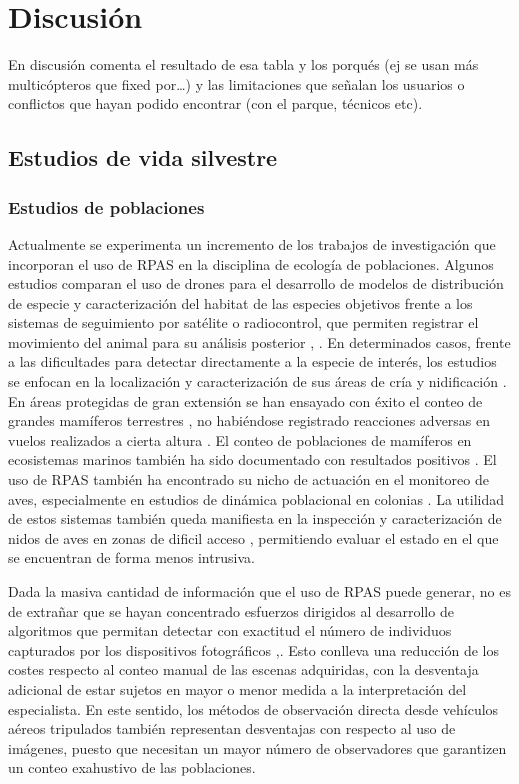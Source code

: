\documentclass[11pt,]{article}
\begin{document}
\section{Discusión}\label{discusion}

En discusión comenta el resultado de esa tabla y los porqués (ej se usan
más multicópteros que fixed por\ldots{}) y las limitaciones que señalan
los usuarios o conflictos que hayan podido encontrar (con el parque,
técnicos etc).

\subsection{Estudios de vida
silvestre}\label{estudios-de-vida-silvestre}

\subsubsection{Estudios de poblaciones}\label{estudios-de-poblaciones}

Actualmente se experimenta un incremento de los trabajos de
investigación que incorporan el uso de RPAS en la disciplina de ecología
de poblaciones. Algunos estudios comparan el uso de drones para el
desarrollo de modelos de distribución de especie y caracterización del
habitat de las especies objetivos frente a los sistemas de seguimiento
por satélite o radiocontrol, que permiten registrar el movimiento del
animal para su análisis posterior \citep{PazmanyMulero2015},
\citep{Mulero-Pazmany2015}. En determinados casos, frente a las
dificultades para detectar directamente a la especie de interés, los
estudios se enfocan en la localización y caracterización de sus áreas de
cría y nidificación \citep{VanAndel2015}. En áreas protegidas de gran
extensión se han ensayado con éxito el conteo de grandes mamíferos
terrestres , no habiéndose registrado reacciones adversas en vuelos
realizados a cierta altura \citep{Vermeulen2013}. El conteo de
poblaciones de mamíferos en ecosistemas marinos también ha sido
documentado con resultados positivos \citep{Hodgson2013}. El uso de RPAS
también ha encontrado su nicho de actuación en el monitoreo de aves,
especialmente en estudios de dinámica poblacional en colonias
\citep{Sarda-Palomera2012}. La utilidad de estos sistemas también queda
manifiesta en la inspección y caracterización de nidos de aves en zonas
de dificil acceso \citep{Weissensteiner2015}, permitiendo evaluar el
estado en el que se encuentran de forma menos intrusiva.

Dada la masiva cantidad de información que el uso de RPAS puede generar,
no es de extrañar que se hayan concentrado esfuerzos dirigidos al
desarrollo de algoritmos que permitan detectar con exactitud el número
de individuos capturados por los dispositivos fotográficos
\citep{Lhoest2015},\citep{Abd-Elrahman2005a}. Esto conlleva una
reducción de los costes respecto al conteo manual de las escenas
adquiridas, con la desventaja adicional de estar sujetos en mayor o
menor medida a la interpretación del especialista. En este sentido, los
métodos de observación directa desde vehículos aéreos tripulados también
representan desventajas con respecto al uso de imágenes, puesto que
necesitan un mayor número de observadores que garantizen un conteo
exahustivo de las poblaciones.
\end{document}
